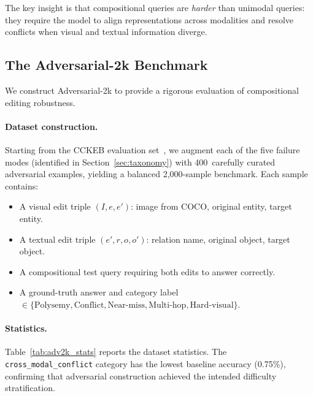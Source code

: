 \documentclass[11pt]{article}
\begin{document}
The key insight is that compositional queries are \emph{harder} than unimodal
queries: they require the model to align representations across modalities and
resolve conflicts when visual and textual information diverge.

\subsection{The Adversarial-2k Benchmark}
\label{sec:benchmark_construction}

We construct Adversarial-2k to provide a rigorous evaluation of compositional
editing robustness.

\paragraph{Dataset construction.}
Starting from the CCKEB evaluation set~\citep{memeic2025}, we augment each of
the five failure modes (identified in Section~\ref{sec:taxonomy}) with
400~carefully curated adversarial examples, yielding a balanced 2{,}000-sample
benchmark. Each sample contains:
\begin{itemize}[leftmargin=*,itemsep=1pt]
  \item A visual edit triple $(I, e, e')$: image from COCO, original entity, target entity.
  \item A textual edit triple $(e', r, o, o')$: relation name, original object, target object.
  \item A compositional test query requiring both edits to answer correctly.
  \item A ground-truth answer and category label $\in \{\text{Polysemy}, \text{Conflict},
    \text{Near-miss}, \text{Multi-hop}, \text{Hard-visual}\}$.
\end{itemize}

\paragraph{Statistics.}
Table~\ref{tab:adv2k_stats} reports the dataset statistics. The
\texttt{cross\_modal\_conflict} category has the lowest baseline accuracy
(0.75\%), confirming that adversarial construction achieved the intended
difficulty stratification.
\end{document}
